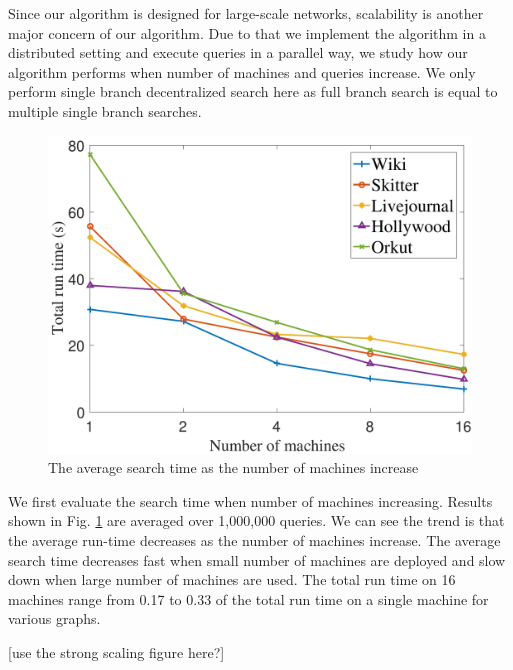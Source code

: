 Since our algorithm is designed for large-scale networks, scalability is another major concern of our algorithm. Due to that we implement the algorithm in a distributed setting and execute queries in a parallel way, we study how our algorithm performs when number of machines and queries increase. We only perform single branch decentralized search here as full branch search is equal to multiple single branch searches.

\begin{figure}[t]
    \centering
    \includegraphics[width=\linewidth]{./figures/scale_machine.pdf}
    \caption{The average search time as the number of machines increase}
    \label{fig:scale_machine}
\end{figure}

We first evaluate the search time when number of machines increasing. Results shown in Fig. \ref{fig:scale_machine} are averaged over 1,000,000 queries. We can see the trend is that the average run-time decreases as the number of machines increase. The average search time decreases fast when small number of machines are deployed and slow down when large number of machines are used. The total run time on 16 machines range from 0.17 to 0.33 of the total run time on a single machine for various graphs.

[use the strong scaling figure here?]

